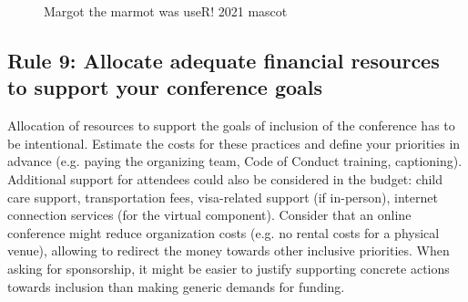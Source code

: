 \documentclass[10pt,letterpaper]{article}
\begin{document}
\begin{figure}[!h]
\centering
{}
\caption{Margot the marmot was useR! 2021 mascot}
\label{fig:marmots}
\end{figure}

\subsection*{Rule 9: Allocate adequate financial resources to support your conference goals}
\label{rule_financial}

Allocation of resources to support the goals of inclusion of the conference has to be intentional. 
Estimate the costs for these practices and define your priorities in advance (e.g. paying the organizing team, Code of Conduct training, captioning).
Additional support for attendees could also be considered in the budget: child care support, transportation fees, visa-related support (if in-person), internet connection services (for the virtual component). 
Consider that an online conference might reduce organization costs (e.g. no rental costs for a physical venue), allowing to redirect the money towards other inclusive priorities. 
When asking for sponsorship, it might be easier to justify supporting concrete actions towards inclusion than making generic demands for funding.

\end{document}
